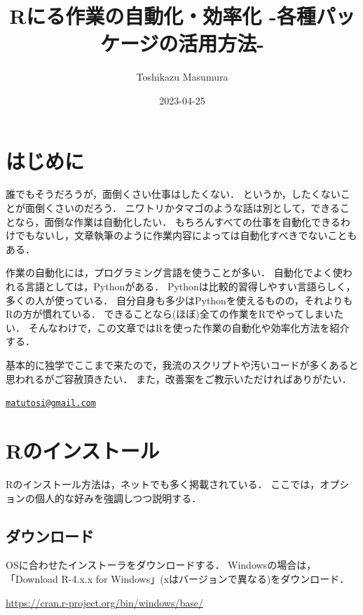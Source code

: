 \documentclass[
]{article}
\title{Rにる作業の自動化・効率化 -各種パッケージの活用方法-}
\author{Toshikazu Masumura}
\date{2023-04-25}
\begin{document}
\maketitle

{
\setcounter{tocdepth}{2}
\tableofcontents
}
\hypertarget{ux306fux3058ux3081ux306b}{%
\section*{はじめに}\label{ux306fux3058ux3081ux306b}}

誰でもそうだろうが，面倒くさい仕事はしたくない．
というか，したくないことが面倒くさいのだろう．
ニワトリかタマゴのような話は別として，できることなら，面倒な作業は自動化したい．
もちろんすべての仕事を自動化できるわけでもないし，文章執筆のように作業内容によっては自動化すべきでないこともある．

作業の自動化には，プログラミング言語を使うことが多い．
自動化でよく使われる言語としては，Pythonがある．
Pythonは比較的習得しやすい言語らしく，多くの人が使っている．
自分自身も多少はPythonを使えるものの，それよりもRの方が慣れている．
できることなら(ほぼ)全ての作業をRでやってしまいたい．
そんなわけで，この文章ではRを使った作業の自動化や効率化方法を紹介する．

基本的に独学でここまで来たので，我流のスクリプトや汚いコードが多くあると思われるがご容赦頂きたい．
また，改善案をご教示いただければありがたい．

\href{mailto:matutosi@gmail.com}{\nolinkurl{matutosi@gmail.com}}

\hypertarget{install}{%
\section{Rのインストール}\label{install}}

Rのインストール方法は，ネットでも多く掲載されている．
ここでは，オプションの個人的な好みを強調しつつ説明する．

\hypertarget{ux30c0ux30a6ux30f3ux30edux30fcux30c9}{%
\subsection{ダウンロード}\label{ux30c0ux30a6ux30f3ux30edux30fcux30c9}}

OSに合わせたインストーラをダウンロードする．
Windowsの場合は，「Download R-4.x.x for Windows」(xはバージョンで異なる)をダウンロード．

\url{https://cran.r-project.org/bin/windows/base/}
\end{document}
